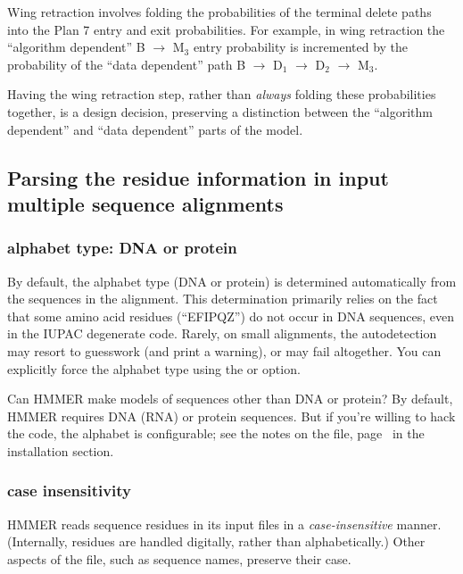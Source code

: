 Wing retraction involves folding the probabilities of the terminal
delete paths into the Plan 7 entry and exit probabilities. For
example, in wing retraction the ``algorithm dependent'' B
$\rightarrow$ M$_{3}$ entry probability is incremented by the
probability of the ``data dependent'' path B $\rightarrow$ D$_1$
$\rightarrow$ D$_2$ $\rightarrow$ M$_3$.

Having the wing retraction step, rather than {\em always} folding
these probabilities together, is a design decision, preserving a
distinction between the ``algorithm dependent'' and ``data dependent''
parts of the model.

\subsection{Parsing the residue information in input multiple sequence alignments}

\subsubsection{alphabet type: DNA or protein}

By default, the alphabet type (DNA or protein) is determined
automatically from the sequences in the alignment. This determination
primarily relies on the fact that some amino acid residues
(``EFIPQZ'') do not occur in DNA sequences, even in the IUPAC
degenerate code. Rarely, on small alignments, the autodetection may
resort to guesswork (and print a warning), or may fail altogether. You
can explicitly force the alphabet type using the  or
 option. 

\begin{srefaq}{Can HMMER make models of sequences other than DNA or
protein?} By default, HMMER requires DNA (RNA) or protein sequences.
But if you're willing to hack the code, the alphabet is configurable;
see the notes on the  file,
page~\pageref{section:alphabet-config} in the installation section.
\end{srefaq}

\subsubsection{case insensitivity}

HMMER reads sequence residues in its input files in a
\emph{case-insensitive} manner.  (Internally, residues are handled
digitally, rather than alphabetically.) Other aspects of the file,
such as sequence names, preserve their case.

